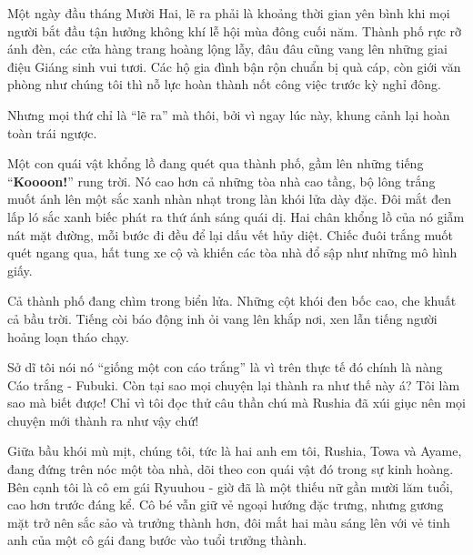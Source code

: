 \documentclass[../main.tex]{subfiles}
\begin{document}


Một ngày đầu tháng Mười Hai, lẽ ra phải là khoảng thời gian yên bình khi mọi người bắt đầu tận hưởng không khí lễ hội mùa đông cuối năm. Thành phố rực rỡ ánh đèn, các cửa hàng trang hoàng lộng lẫy, đâu đâu cũng vang lên những giai điệu Giáng sinh vui tươi. Các hộ gia đình bận rộn chuẩn bị quà cáp, còn giới văn phòng như chúng tôi thì nỗ lực hoàn thành nốt công việc trước kỳ nghỉ đông.

Nhưng mọi thứ chỉ là ``lẽ ra'' mà thôi, bởi vì ngay lúc này, khung cảnh lại hoàn toàn trái ngược.

Một con quái vật khổng lồ đang quét qua thành phố, gầm lên những tiếng ``\textbf{Koooon!}'' rung trời. Nó cao hơn cả những tòa nhà cao tầng, bộ lông trắng muốt ánh lên một sắc xanh nhàn nhạt trong làn khói lửa dày đặc. Đôi mắt đen lấp ló sắc xanh biếc phát ra thứ ánh sáng quái dị. Hai chân khổng lồ của nó giẫm nát mặt đường, mỗi bước đi đều để lại dấu vết hủy diệt. Chiếc đuôi trắng muốt quét ngang qua, hất tung xe cộ và khiến các tòa nhà đổ sập như những mô hình giấy.

Cả thành phố đang chìm trong biển lửa. Những cột khói đen bốc cao, che khuất cả bầu trời. Tiếng còi báo động inh ỏi vang lên khắp nơi, xen lẫn tiếng người hoảng loạn tháo chạy.


Sở dĩ tôi nói nó ``giống một con cáo trắng'' là vì trên thực tế đó chính là nàng Cáo trắng - Fubuki. Còn tại sao mọi chuyện lại thành ra như thế này á? Tôi làm sao mà biết được! Chỉ vì tôi đọc thử câu thần chú mà Rushia đã xúi giục nên mọi chuyện mới thành ra như vậy chứ!

Giữa bầu khói mù mịt, chúng tôi, tức là hai anh em tôi, Rushia, Towa và Ayame, đang đứng trên nóc một tòa nhà, dõi theo con quái vật đó trong sự kinh hoàng. Bên cạnh tôi là cô em gái Ryuuhou - giờ đã là một thiếu nữ gần mười lăm tuổi, cao hơn trước đáng kể. Cô bé vẫn giữ vẻ ngoại hướng đặc trưng, nhưng gương mặt trở nên sắc sảo và trưởng thành hơn, đôi mắt hai màu sáng lên với vẻ tinh anh của một cô gái đang bước vào tuổi trưởng thành.
\end{document}
